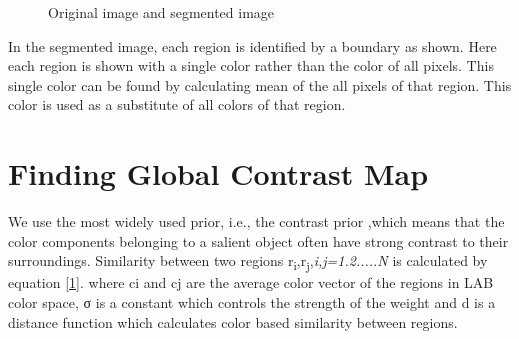 \begin{figure}[here]%
    \centering
    \qquad
    
    
    \caption{Original image and segmented image}%
    \label{superpixel}%
\end{figure}
\noindent
In the segmented image, each region is identified by a boundary as shown. Here each region is shown with a single color rather than the color of all pixels. This single color can be found by calculating mean of the all pixels of that region. This color is used as a substitute of all colors of that region.


\section{Finding Global Contrast Map}
 We use the most widely used prior, i.e., the contrast prior ,which means that the color components belonging to a salient object often have strong contrast to their surroundings. Similarity  between two regions r\textsubscript{i},r\textsubscript{j},\textit{i,j=1.2.....N} is calculated by equation \eqref{1}. where ci and cj are the average color vector of the regions in LAB color space, σ is a constant which controls the strength of the weight and d is a distance function which calculates color based similarity between regions.
 
